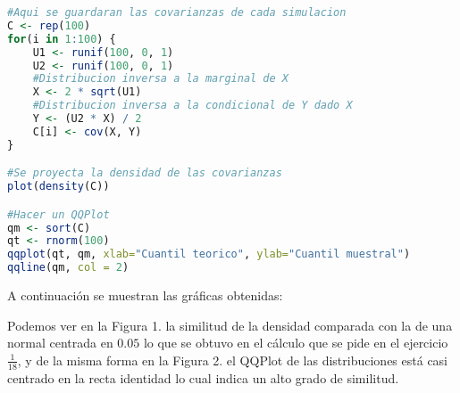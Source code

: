 \documentclass[12pt]{article}
\begin{document}
\begin{lstlisting}[language=R]
#Aqui se guardaran las covarianzas de cada simulacion
C <- rep(100)
for(i in 1:100) {
	U1 <- runif(100, 0, 1)
	U2 <- runif(100, 0, 1)
	#Distribucion inversa a la marginal de X
	X <- 2 * sqrt(U1)
	#Distribucion inversa a la condicional de Y dado X
	Y <- (U2 * X) / 2
	C[i] <- cov(X, Y)
}

#Se proyecta la densidad de las covarianzas
plot(density(C))

#Hacer un QQPlot
qm <- sort(C)
qt <- rnorm(100)
qqplot(qt, qm, xlab="Cuantil teorico", ylab="Cuantil muestral")
qqline(qm, col = 2)
\end{lstlisting}

A continuación se muestran las gráficas obtenidas:
\begin{figure}[H]
	\centering
	\hfill
\end{figure}

\begin{figure}[H]
	\centering
	\hfill
\end{figure}

Podemos ver en la Figura 1. la similitud de la densidad comparada con la de una normal centrada en $0.05$ lo que se obtuvo en el cálculo que se pide en el ejercicio $\frac{1}{18}$, y de la misma forma en la Figura 2. el QQPlot de las distribuciones está casi centrado en la recta identidad lo cual indica un alto grado de similitud.
\end{document}
